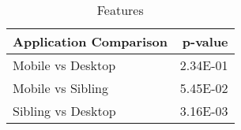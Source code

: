 \begin{table}[ht]
\centering
\caption{Features} 
\begin{tabular}{lr}
  \hline
Application Comparison & p-value \\ 
  \hline
Mobile vs Desktop & 2.34E-01 \\ 
  Mobile vs Sibling & 5.45E-02 \\ 
  Sibling vs Desktop & 3.16E-03 \\ 
   \hline
\end{tabular}
\end{table}
